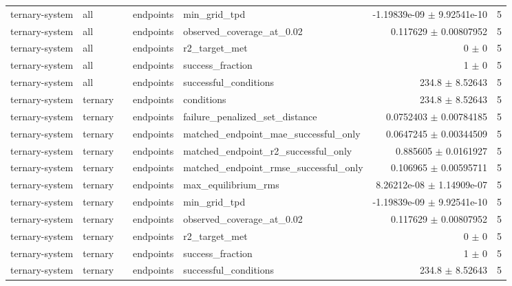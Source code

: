 \begin{tabular}{lllllrr}
ternary-system & all &  & endpoints & min_grid_tpd & -1.19839e-09 $\pm$ 9.92541e-10 & 5 \\
ternary-system & all &  & endpoints & observed_coverage_at_0.02 & 0.117629 $\pm$ 0.00807952 & 5 \\
ternary-system & all &  & endpoints & r2_target_met & 0 $\pm$ 0 & 5 \\
ternary-system & all &  & endpoints & success_fraction & 1 $\pm$ 0 & 5 \\
ternary-system & all &  & endpoints & successful_conditions & 234.8 $\pm$ 8.52643 & 5 \\
ternary-system & ternary &  & endpoints & conditions & 234.8 $\pm$ 8.52643 & 5 \\
ternary-system & ternary &  & endpoints & failure_penalized_set_distance & 0.0752403 $\pm$ 0.00784185 & 5 \\
ternary-system & ternary &  & endpoints & matched_endpoint_mae_successful_only & 0.0647245 $\pm$ 0.00344509 & 5 \\
ternary-system & ternary &  & endpoints & matched_endpoint_r2_successful_only & 0.885605 $\pm$ 0.0161927 & 5 \\
ternary-system & ternary &  & endpoints & matched_endpoint_rmse_successful_only & 0.106965 $\pm$ 0.00595711 & 5 \\
ternary-system & ternary &  & endpoints & max_equilibrium_rms & 8.26212e-08 $\pm$ 1.14909e-07 & 5 \\
ternary-system & ternary &  & endpoints & min_grid_tpd & -1.19839e-09 $\pm$ 9.92541e-10 & 5 \\
ternary-system & ternary &  & endpoints & observed_coverage_at_0.02 & 0.117629 $\pm$ 0.00807952 & 5 \\
ternary-system & ternary &  & endpoints & r2_target_met & 0 $\pm$ 0 & 5 \\
ternary-system & ternary &  & endpoints & success_fraction & 1 $\pm$ 0 & 5 \\
ternary-system & ternary &  & endpoints & successful_conditions & 234.8 $\pm$ 8.52643 & 5 \\
\end{tabular}